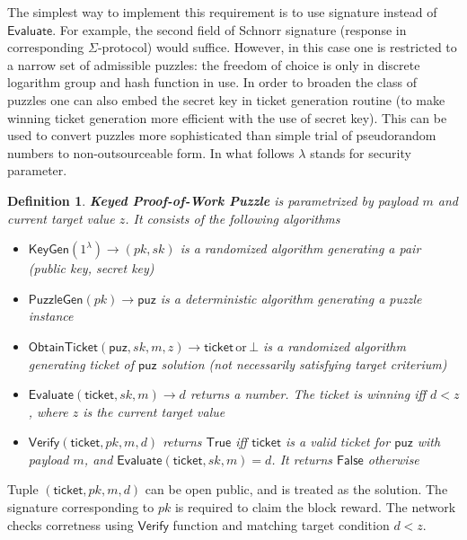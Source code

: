 \documentclass[]{article}
\newcommand{\Ticket}{\mathsf{ticket}}
\newcommand{\KeyGen}{\mathsf{KeyGen}}
\newcommand{\PuzzleGen}{\mathsf{PuzzleGen}}
\newcommand{\Eval}{\mathsf{Evaluate}}
\newcommand{\Verify}{\mathsf{Verify}}
\newcommand{\ObtainTicket}{\mathsf{ObtainTicket}}
\newtheorem{definition}{Definition}
\begin{document}
    The simplest way to implement this requirement is to use signature instead
    of $\Eval$. For example, the second field of Schnorr signature (response in
    corresponding $\Sigma$-protocol) would suffice. However, in this case one is
    restricted to a narrow set of admissible puzzles: the freedom of choice is
    only in discrete logarithm group and hash function in use. In order to
    broaden the class of puzzles one can also embed the secret key in ticket
    generation routine (to make winning ticket generation more efficient with
    the use of secret key). This can be used to convert puzzles more sophisticated
    than simple trial of pseudorandom numbers to non-outsourceable form. In what
    follows $\lambda$ stands for security parameter.
    \begin{definition}
        {\bf Keyed Proof-of-Work Puzzle} is parametrized by payload $m$ and
        current target value $z$. It consists of the following algorithms
        \begin{itemize}
            \item $\KeyGen(1^\lambda)\rightarrow (pk,sk)$ is a randomized
                algorithm generating a pair (public key, secret key)
            \item $\PuzzleGen(pk)\rightarrow \mathsf{puz}$ is a deterministic
                algorithm generating a puzzle instance
            \item
                $\ObtainTicket(\mathsf{puz},sk,m,z)\rightarrow\Ticket \,
                \mathrm{or}\,\bot$
                is a randomized algorithm generating ticket of 
                $\mathsf{puz}$ solution (not necessarily satisfying target
                criterium)
            \item $\Eval(\Ticket,sk,m)\rightarrow d$
                returns a number. The ticket is winning iff $d<z$, where $z$
                is the current target value
            \item $\Verify(\Ticket,pk,m,d)$ returns $\mathsf{True}$ iff
                $\Ticket$ is a valid ticket for $\mathsf{puz}$ with payload $m$,
                and $\Eval(\Ticket,sk,m)=d$. It returns $\mathsf{False}$
                otherwise
        \end{itemize}
    \end{definition}
    Tuple $(\Ticket, pk, m, d)$ can be open public, and is treated as the
    solution. The signature corresponding to $pk$ is required to claim the block
    reward. The network checks corretness using $\Verify$ function and matching
    target condition $d<z$.
\end{document}
